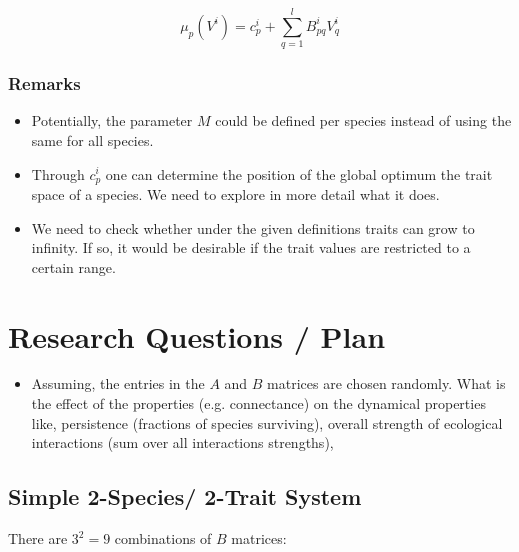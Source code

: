 \documentclass[
12.5pt, 					%
a4paper, 				%
oneside,					%
headinclude,footinclude, %
BCOR5mm, 				%
abstract=on
]{scrreprt}
\numberwithin{equation}{chapter}
\begin{document}
\begin{equation}
\label{eq:fitness_function_epistatic_effect}
\mu_p(V^i) = c_p^i + \sum_{q=1}^l B_{pq}^i V^i_q
\end{equation}

\subsubsection*{Remarks}

\begin{itemize}
\item
Potentially, the parameter $M$ could be defined per species instead of using the same for all species.

\item
Through $c_p^i$ one can determine the position of the global optimum the trait space of a species. We need to explore in more detail what it does.

\item
We need to check whether under the given definitions traits can grow to infinity.
If so, it would be desirable if the trait values are restricted to a certain range.


\end{itemize}


\section*{Research Questions / Plan}

\begin{itemize}
\item Assuming, the entries in the $A$ and $B$ matrices are chosen randomly.
What is the effect of the properties (e.g. connectance) on the dynamical properties like,
persistence (fractions of species surviving), overall strength of ecological interactions
(sum over all interactions strengths), 
\newline

\end{itemize}

\subsection{Simple 2-Species/ 2-Trait System}

There are $3^2=9$ combinations of $B$ matrices:
\end{document}
